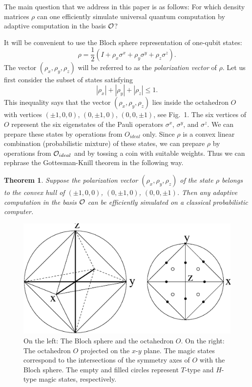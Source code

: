\documentclass[pra,twocolumn,showpacs]{revtex4}
\newtheorem{theorem}{Theorem}
\newcommand{\calO}{{\cal O }}
\newcommand{\sx}{\sigma^x}
\newcommand{\sy}{\sigma^y}
\newcommand{\sz}{\sigma^z}
\newcommand{\Tt}{$T$}
\newcommand{\Hh}{$H$}
\begin{document}
The main question that we address in this paper is as follows: For which
density matrices $\rho$ can one efficiently simulate universal quantum
computation by adaptive computation in the basis $\calO$?
 
It will be convenient to use the Bloch sphere representation of one-qubit
states:
\[
\rho=\frac12 \left( I + \rho_x \sx + \rho_y \sy + \rho_z \sz \right).
\]
The vector $(\rho_x,\rho_y,\rho_z)$ will be referred to as the {\it
polarization vector} of $\rho$. Let us first consider the subset of states
satisfying
\[
\label{inside_T}
|\rho_x| + |\rho_y| + |\rho_z| \le 1.
\]
This inequality says that the vector $(\rho_x,\rho_y,\rho_z)$ lies inside the
octahedron $O$ with vertices $(\pm 1,0,0)$, $(0,\pm 1,0)$, $(0,0,\pm 1)$, see
Fig.~1. The six vertices of $O$ represent the six eigenstates of the Pauli
operators $\sx$, $\sy$, and $\sz$. We can prepare these states by operations
from $O_{ideal}$ only. Since $\rho$ is a convex linear combination
(probabilistic mixture) of these states, we can prepare $\rho$ by operations
from $\calO_{ideal}$ and by tossing a coin with suitable weights. Thus we can
rephrase the Gottesman-Knill theorem in the following way.
\begin{theorem}
\label{Gottesman-Knill}
Suppose the polarization vector $(\rho_x,\rho_y,\rho_z)$ of the state $\rho$
belongs to the convex hull of $(\pm 1,0,0)$, $(0,\pm 1,0)$, $(0,0,\pm 1)$.
Then any adaptive computation in the basis $\calO$ can be efficiently
simulated on a classical probabilistic computer.
\end{theorem}

\begin{figure}
\includegraphics[scale=0.4]{figure1.eps}
\caption{On the left: The Bloch sphere and the octahedron $O$.  On the right:
The octahedron $O$ projected on the $x$-$y$ plane.  The magic states
correspond to the intersections of the symmetry axes of $O$ with the Bloch
sphere.  The empty and filled circles represent \Tt-type and \Hh-type magic
states, respectively.}
\end{figure}
\end{document}
